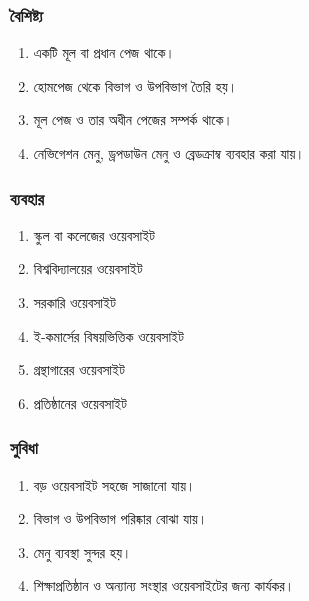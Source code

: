 \par\noindent
\begin{minipage}[t]{.48\linewidth}\vspace{0pt}
\subsubsection{বৈশিষ্ট্য}

\begin{enumerate}
\item একটি মূল বা প্রধান পেজ থাকে।
\item হোমপেজ থেকে বিভাগ ও উপবিভাগ তৈরি হয়।
\item মূল পেজ ও তার অধীন পেজের সম্পর্ক থাকে।
\item নেভিগেশন মেনু, ড্রপডাউন মেনু ও ব্রেডক্রাম্ব ব্যবহার করা যায়।
\end{enumerate}
\end{minipage}\hfill
\begin{minipage}[t]{.48\linewidth}\vspace{0pt}
\subsubsection{ব্যবহার}

\begin{enumerate}
\item স্কুল বা কলেজের ওয়েবসাইট
\item বিশ্ববিদ্যালয়ের ওয়েবসাইট
\item সরকারি ওয়েবসাইট
\item ই-কমার্সের বিষয়ভিত্তিক ওয়েবসাইট
\item গ্রন্থাগারের ওয়েবসাইট
\item প্রতিষ্ঠানের ওয়েবসাইট
\end{enumerate}
\end{minipage}\par\smallskip
\par\noindent
\begin{minipage}[t]{.48\linewidth}\vspace{0pt}
\subsubsection{সুবিধা}
\begin{enumerate}
\item বড় ওয়েবসাইট সহজে সাজানো যায়।
\item বিভাগ ও উপবিভাগ পরিষ্কার বোঝা যায়।
\item মেনু ব্যবস্থা সুন্দর হয়।
\item শিক্ষাপ্রতিষ্ঠান ও অন্যান্য সংস্থার ওয়েবসাইটের জন্য কার্যকর।
\end{enumerate}
\end{minipage}\hfill
